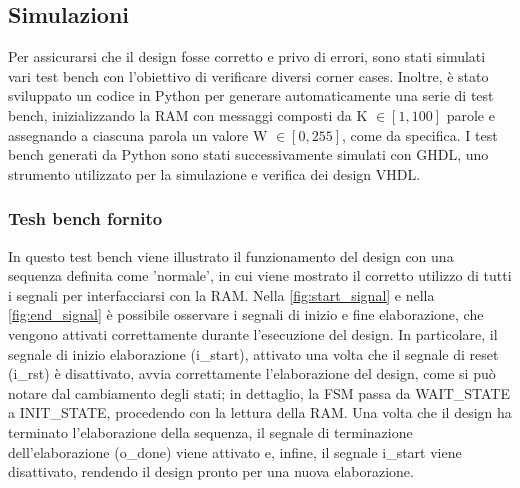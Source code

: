 \documentclass[11pt,a4paper]{article}
\newcommand{\m}[1]{{\scriptsize\fontfamily{fvm}\selectfont #1}}
\begin{document}
\subsection{Simulazioni}

\hspace{1em} Per assicurarsi che il design fosse corretto e privo di errori, sono stati simulati vari test bench con l'obiettivo di verificare diversi corner cases. Inoltre, è stato sviluppato un codice in Python per generare automaticamente una serie di test bench, inizializzando la RAM con messaggi composti da \m{K} $\in [1, 100]$ parole e assegnando a ciascuna parola un valore \m{W} $\in [0, 255]$, come da specifica. I test bench generati da Python sono stati successivamente simulati con GHDL, uno strumento utilizzato per la simulazione e verifica dei design VHDL.

\subsubsection{Tesh bench fornito}

In questo test bench viene illustrato il funzionamento del design con una sequenza definita come 'normale', in cui viene mostrato il corretto utilizzo di tutti i segnali per interfacciarsi con la RAM. Nella \autoref{fig:start_signal} e nella \autoref{fig:end_signal} è possibile osservare i segnali di inizio e fine elaborazione, che vengono attivati correttamente durante l'esecuzione del design. In particolare, il segnale di inizio elaborazione (\m{i\_start}), attivato una volta che il segnale di reset (\m{i\_rst}) è disattivato, avvia correttamente l'elaborazione del design, come si può notare dal cambiamento degli stati; in dettaglio, la FSM passa da \m{WAIT\_STATE} a \m{INIT\_STATE}, procedendo con la lettura della RAM. Una volta che il design ha terminato l'elaborazione della sequenza, il segnale di terminazione dell'elaborazione (\m{o\_done}) viene attivato e, infine, il segnale \m{i\_start} viene disattivato, rendendo il design pronto per una nuova elaborazione.

\vspace{0.5em}
\end{document}
